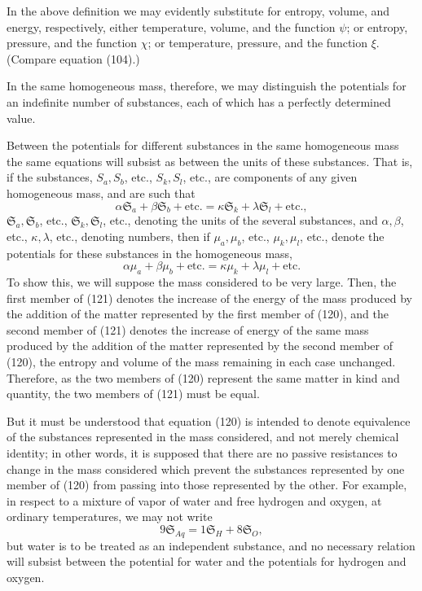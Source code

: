 \documentclass[11pt]{article}
\newcommand{\unit}[1]{\mathfrak{S}_{#1}}
\begin{document}
In the above definition we may evidently substitute for entropy, volume, and energy, respectively, either temperature, volume, and the function \(\psi\); or entropy, pressure, and the function \(\chi\); or temperature, pressure, and the function \(\xi\). (Compare equation (104).)

In the same homogeneous mass, therefore, we may distinguish the potentials for an indefinite number of substances, each of which has a perfectly determined value.

Between the potentials for different substances in the same homogeneous mass the same equations will subsist as between the units of these substances. That is, if the substances, \(S_a,S_b\), etc., \(S_k,S_l\), etc., are components of any given homogeneous mass, and are such that
\begin{equation}
\alpha\unit{a}+\beta\unit{b}+\text{etc.}=\kappa\unit{k}+\lambda\unit{l}+\text{etc.},
\end{equation}
\(\unit{a},\unit{b}\), etc., \(\unit{k},\unit{l}\), etc., denoting the units of the several substances, and \(\alpha,\beta\), etc., \(\kappa,\lambda\), etc., denoting numbers, then if \(\mu_a,\mu_b\), etc., \(\mu_k,\mu_l\), etc., denote the potentials for these substances in the homogeneous mass,
\begin{equation}
\alpha\mu_a+\beta\mu_b+\text{etc.}=\kappa\mu_k+\lambda\mu_l+\text{etc.}
\end{equation}
To show this, we will suppose the mass considered to be very large. Then, the first member of (121) denotes the increase of the energy of the mass produced by the addition of the matter represented by the first member of (120), and the second member of (121) denotes the increase of energy of the same mass produced by the addition of the matter represented by the second member of (120), the entropy and volume of the mass remaining in each case unchanged. Therefore, as the two members of (120) represent the same matter in kind and quantity, the two members of (121) must be equal.

But it must be understood that equation (120) is intended to denote equivalence of the substances represented in the mass considered, and not merely chemical identity; in other words, it is supposed that there are no passive resistances to change in the mass considered which prevent the substances represented by one member of (120) from passing into those represented by the other. For example, in respect to a mixture of vapor of water and free hydrogen and oxygen, at ordinary temperatures, we may not write
\[
9\unit{Aq}=1\unit{H}+8\unit{O},
\]
but water is to be treated as an independent substance, and no necessary relation will subsist between the potential for water and the potentials for hydrogen and oxygen.
\end{document}
